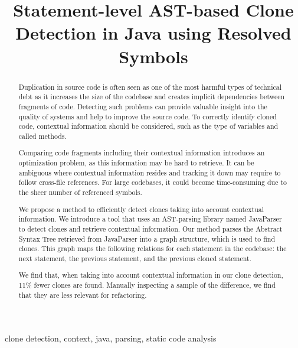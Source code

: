 \documentclass[conference]{IEEEtran}
\begin{document}
\title{Statement-level AST-based Clone Detection in Java using Resolved Symbols}
\author{
}

\maketitle

\thispagestyle{plain}
\pagestyle{plain}

\begin{abstract}
Duplication in source code is often seen as one of the most harmful types of technical debt as it increases the size of the codebase and creates implicit dependencies between fragments of code. Detecting such problems can provide valuable insight into the quality of systems and help to improve the source code. To correctly identify cloned code, contextual information should be considered, such as the type of variables and called methods.

Comparing code fragments including their contextual information introduces an optimization problem, as this information may be hard to retrieve. It can be ambiguous where contextual information resides and tracking it down may require to follow cross-file references. For large codebases, it could become time-consuming due to the sheer number of referenced symbols.

We propose a method to efficiently detect clones taking into account contextual information. We introduce a tool that uses an AST-parsing library named JavaParser to detect clones and retrieve contextual information. Our method parses the Abstract Syntax Tree retrieved from JavaParser into a graph structure, which is used to find clones. This graph maps the following relations for each statement in the codebase: the next statement, the previous statement, and the previous cloned statement.

We find that, when taking into account contextual information in our clone detection, 11\% fewer clones are found. Manually inspecting a sample of the difference, we find that they are less relevant for refactoring.
\end{abstract}

\begin{IEEEkeywords}
clone detection, context, java, parsing, static code analysis
\end{IEEEkeywords}
\end{document}
